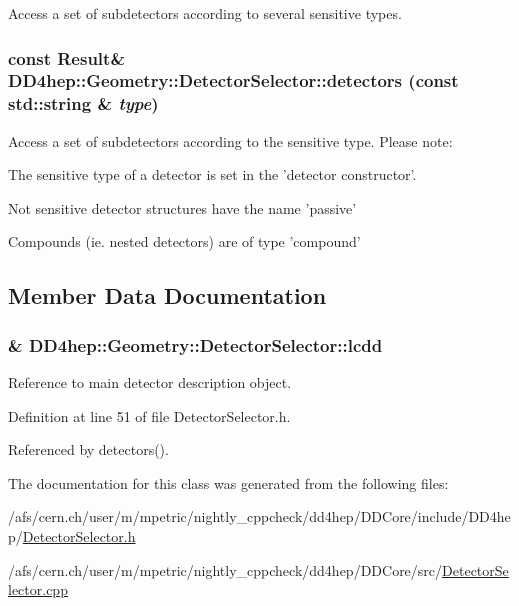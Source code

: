 Access a set of subdetectors according to several sensitive types. \hypertarget{class_d_d4hep_1_1_geometry_1_1_detector_selector_ad9407f2aa15753164488fe498e167d9f}{
\subsubsection[{detectors}]{\setlength{\rightskip}{0pt plus 5cm}const {\bf Result}\& DD4hep::Geometry::DetectorSelector::detectors (const std::string \& {\em type})}}
\label{class_d_d4hep_1_1_geometry_1_1_detector_selector_ad9407f2aa15753164488fe498e167d9f}


Access a set of subdetectors according to the sensitive type. Please note:
\begin{DoxyItemize}
\item The sensitive type of a detector is set in the 'detector constructor'.
\item Not sensitive detector structures have the name 'passive'
\item Compounds (ie. nested detectors) are of type 'compound' 
\end{DoxyItemize}

\subsection{Member Data Documentation}
\hypertarget{class_d_d4hep_1_1_geometry_1_1_detector_selector_a6091743fea97ad21aa2bca9e5da2d3d0}{
\subsubsection[{lcdd}]{\& {\bf DD4hep::Geometry::DetectorSelector::lcdd}}}
\label{class_d_d4hep_1_1_geometry_1_1_detector_selector_a6091743fea97ad21aa2bca9e5da2d3d0}


Reference to main detector description object. 

Definition at line 51 of file DetectorSelector.h.

Referenced by detectors().

The documentation for this class was generated from the following files:\begin{DoxyCompactItemize}
\item 
/afs/cern.ch/user/m/mpetric/nightly\_\-cppcheck/dd4hep/DDCore/include/DD4hep/\hyperlink{_detector_selector_8h}{DetectorSelector.h}\item 
/afs/cern.ch/user/m/mpetric/nightly\_\-cppcheck/dd4hep/DDCore/src/\hyperlink{_detector_selector_8cpp}{DetectorSelector.cpp}\end{DoxyCompactItemize}

